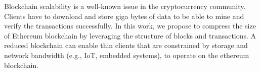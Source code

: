 Blockchain scalability is a well-known issue in the cryptocurrency community.
Clients have to download and store giga bytes of data to be able to mine and verify the transactions successfully.
In this work, we propose to compress the size of Ethereum blockchain by leveraging the structure of blocks and transactions.
A reduced blockchain can enable thin clients  that are constrained by storage and network bandwidth (e.g., IoT, embedded systems),
 to operate on the ethereum blockchain.

